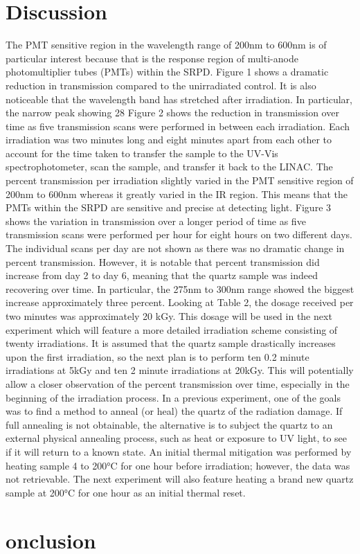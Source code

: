 \documentclass{article}
\begin{document}
\section{Discussion}
The PMT sensitive region in the wavelength range of 200nm to 600nm is of particular interest because that is the response region of multi-anode photomultiplier tubes (PMTs) within the SRPD. Figure 1 shows a dramatic reduction in transmission compared to the unirradiated control. It is also noticeable that the wavelength band has stretched after irradiation. In particular, the narrow peak showing 28%
Figure 2 shows the reduction in transmission over time as five transmission scans were performed in between each irradiation. Each irradiation was two minutes long and eight minutes apart from each other to account for the time taken to transfer the sample to the UV-Vis spectrophotometer, scan the sample, and transfer it back to the LINAC. The percent transmission  per irradiation slightly varied in the PMT sensitive region of 200nm to 600nm whereas it greatly varied in the IR region. This means that the PMTs within the SRPD are sensitive and precise at detecting light. 
Figure 3 shows the variation in transmission over a longer period of time as five transmission scans were performed per hour for eight hours on two different days. The individual scans per day are not shown as there was no dramatic change in percent transmission. However, it is notable that percent transmission did increase from day 2 to day 6, meaning that the quartz sample was indeed recovering over time. In particular, the 275nm to 300nm range showed the biggest increase approximately three percent. 
Looking at Table 2, the dosage received per two minutes was approximately 20 kGy. This dosage will be used in the next experiment which will feature a more detailed irradiation scheme consisting of twenty irradiations. It is assumed that the quartz sample drastically increases upon the first irradiation, so the next plan is to perform ten 0.2 minute irradiations at 5kGy and ten 2 minute irradiations at 20kGy. This will potentially allow a closer observation of the percent transmission over time, especially in the beginning of the irradiation process. 
In a previous experiment, one of the goals was to find a method to anneal (or heal) the quartz of the radiation damage. If full annealing is not obtainable, the alternative is to subject the quartz to an external physical annealing process, such as heat or exposure to UV light, to see if it will return to a known state. An initial thermal mitigation was performed by heating sample 4 to 200°C for one hour before irradiation; however, the data was not retrievable. The next experiment will also feature heating a brand new quartz sample at 200°C for one hour as an initial thermal reset.

\section{onclusion}
\end{document}
